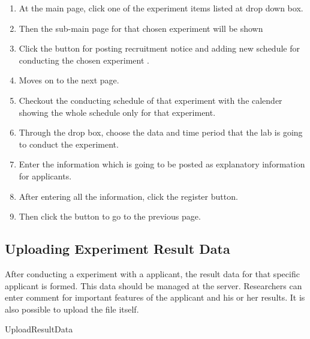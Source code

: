 \documentclass[letterpaper, 10 pt, conference]{ieeeconf}  %
\begin{document}
\begin{enumerate}
    \item At the main page, click one of the experiment items listed at drop down box.
    \item Then the sub-main page for that chosen experiment will be shown
\item Click the button for posting recruitment notice and adding new schedule for conducting the chosen experiment .
\item Moves on to the next page. 
\item Checkout the conducting schedule of that experiment with the calender showing the whole schedule only for that experiment. 
\item Through the drop box, choose the data and time period that the lab is going to conduct the experiment. 
\item Enter the information which is going to be posted as explanatory information  for applicants. 
\item After entering all the information, click the register button.
\item Then click the button to go to the previous page.
    
\end{enumerate}

\subsection{Uploading Experiment Result Data}
After conducting a experiment with a applicant, the result data for that specific applicant is formed. This data should be managed at the server. Researchers can enter comment for important features of the applicant and his or her results. It is also possible to upload the file itself.\\

UploadResultData\\
\end{document}
